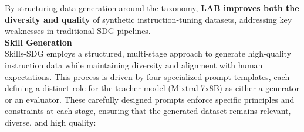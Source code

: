 \documentclass[12pt]{article}
\begin{document}
By structuring data generation around the taxonomy, \textbf{LAB improves both the diversity and quality} of synthetic instruction-tuning datasets, addressing key weaknesses in traditional SDG pipelines.\vspace{14pt}\\
\textbf{Skill Generation}\\
Skills-SDG employs a structured, multi-stage approach to generate high-quality instruction data while maintaining diversity and alignment with human expectations. This process is driven by four specialized prompt templates, each defining a distinct role for the teacher model (Mixtral-7x8B) as either a generator or an evaluator. These carefully designed prompts enforce specific principles and constraints at each stage, ensuring that the generated dataset remains relevant, diverse, and high quality:
\end{document}
